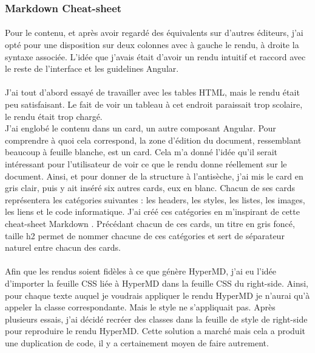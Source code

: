 \documentclass[12pt]{article}
\begin{document}
\subsubsection{Markdown Cheat-sheet}
\paragraph{}
Pour le contenu, et après avoir regardé des équivalents sur d'autres éditeurs, j'ai opté pour une disposition sur deux colonnes avec à gauche le rendu, à droite la syntaxe associée. L'idée que j'avais était d'avoir un rendu intuitif et raccord avec le reste de l'interface et les guidelines Angular.
\paragraph{}
J'ai tout d'abord essayé de travailler avec les tables HTML, mais le rendu était peu satisfaisant. Le fait de voir un tableau à cet endroit paraissait trop scolaire, le rendu était trop chargé.\\
J'ai englobé le contenu dans un card, un autre composant Angular. Pour comprendre à quoi cela correspond, la zone d'édition du document, ressemblant beaucoup à feuille blanche, est un card. Cela m'a donné l'idée qu'il serait intéressant pour l'utilisateur de voir ce que le rendu donne réellement sur le document. Ainsi, et pour donner de la structure à l'antisèche, j'ai mis le card en gris clair, puis y ait inséré six autres cards, eux en blanc. Chacun de ses cards représentera les catégories suivantes : les headers, les styles, les listes, les images, les liens et le code informatique. J'ai créé ces catégories en m'inspirant de cette cheat-sheet Markdown \cite{mdcheat}. Précédant chacun de ces cards, un titre en gris foncé, taille h2 permet de nommer chacune de ces catégories et sert de séparateur naturel entre chacun des cards.
\paragraph{}
Afin que les rendus soient fidèles à ce que génère HyperMD, j'ai eu l'idée d'importer la feuille CSS liée à HyperMD dans la feuille CSS du right-side. Ainsi, pour chaque texte auquel je voudrais appliquer le rendu HyperMD je n'aurai qu'à appeler la classe correspondante. Mais le style ne s'appliquait pas. Après plusieurs essais, j'ai décidé recréer des classes dans la feuille de style de right-side pour reproduire le rendu HyperMD.
Cette solution a marché mais cela a produit une duplication de code, il y a certainement moyen de faire autrement.
\end{document}
